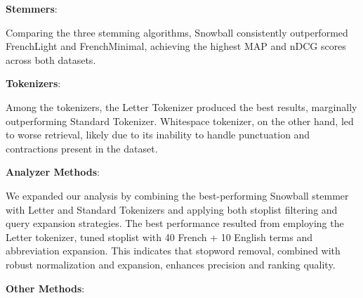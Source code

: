 \pagebreak

\textbf{Stemmers}:

Comparing the three stemming algorithms, Snowball consistently outperformed FrenchLight and FrenchMinimal, achieving the highest MAP and nDCG scores across both datasets.
\vspace{1\baselineskip}

\textbf{Tokenizers}:

Among the tokenizers, the Letter Tokenizer produced the best results, marginally outperforming Standard Tokenizer. Whitespace tokenizer, on the other hand, led to worse retrieval, likely due to its inability to handle punctuation and contractions present in the dataset.
\vspace{1\baselineskip}

\textbf{Analyzer Methods}:

We expanded our analysis by combining the best-performing Snowball stemmer with Letter and Standard Tokenizers and applying both stoplist filtering and query expansion strategies. The best performance resulted from employing the Letter tokenizer, tuned stoplist with 40 French + 10 English terms and abbreviation expansion. This indicates that stopword removal, combined with robust normalization and expansion, enhances precision and ranking quality.
\vspace{1\baselineskip}

\textbf{Other Methods}:

